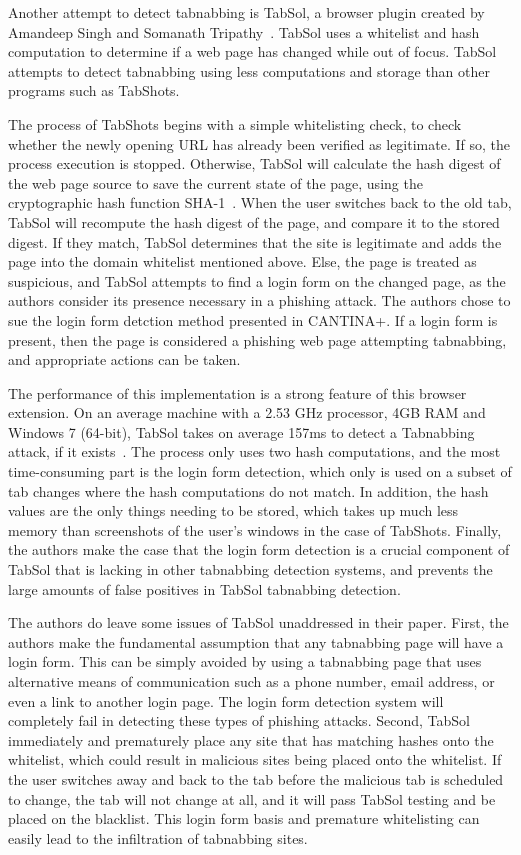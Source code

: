 \documentclass[12pt]{article}
\begin{document}
\begin{doublespace}
Another attempt to detect tabnabbing is TabSol, a browser plugin created by Amandeep Singh and Somanath Tripathy~\cite{TabSol}.  TabSol uses a whitelist and hash computation to determine if a web page has changed while out of focus.  TabSol attempts to detect tabnabbing using less computations and storage than other programs such as TabShots.

The process of TabShots begins with a simple whitelisting check, to check whether the newly opening URL has already been verified as legitimate.  If so, the process execution is stopped.  Otherwise, TabSol will calculate the hash digest of the web page source to save the current state of the page, using the cryptographic hash function SHA-1~\cite{TabShots}.  When the user switches back to the old tab, TabSol will recompute the hash digest of the page, and compare it to the stored digest.  If they match, TabSol determines that the site is legitimate and adds the page into the domain whitelist mentioned above.  Else, the page is treated as suspicious, and TabSol attempts to find a login form on the changed page, as the authors consider its presence necessary in a phishing attack.  The authors chose to sue the login form detction method presented in CANTINA+.  If a login form is present, then the page is considered a phishing web page attempting tabnabbing, and appropriate actions can be taken.

The performance of this implementation is a strong feature of this browser extension.  On an average machine with a 2.53 GHz processor, 4GB RAM and Windows 7 (64-bit), TabSol takes on average 157ms to detect a Tabnabbing attack, if it exists~\cite{TabShots}.  The process only uses two hash computations, and the most time-consuming part is the login form detection, which only is used on a subset of tab changes where the hash computations do not match.  In addition, the hash values are the only things needing to be stored, which takes up much less memory than screenshots of the user's windows in the case of TabShots.  Finally, the authors make the case that the login form detection is a crucial component of TabSol that is lacking in other tabnabbing detection systems, and prevents the large amounts of false positives in TabSol tabnabbing detection.

The authors do leave some issues of TabSol unaddressed in their paper.  First, the authors make the fundamental assumption that any tabnabbing page will have a login form.  This can be simply avoided by using a tabnabbing page that uses alternative means of communication such as a phone number, email address, or even a link to another login page.  The login form detection system will completely fail in detecting these types of phishing attacks.  Second, TabSol immediately and prematurely place any site that has matching hashes onto the whitelist, which could result in malicious sites being placed onto the whitelist.  If the user switches away and back to the tab before the malicious tab is scheduled to change, the tab will not change at all, and it will pass TabSol testing and be placed on the blacklist.  This login form basis and premature whitelisting can easily lead to the infiltration of tabnabbing sites.


\end{doublespace}
\end{document}
